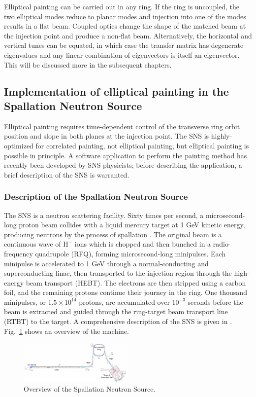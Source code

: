 Elliptical painting can be carried out in any ring. If the ring is uncoupled, the two elliptical modes reduce to planar modes and injection into one of the modes results in a flat beam. Coupled optics change the shape of the matched beam at the injection point and produce a non-flat beam. Alternatively, the horizontal and vertical tunes can be equated, in which case the transfer matrix has degenerate eigenvalues and any linear combination of eigenvectors is itself an eigenvector. This will be discussed more in the subsequent chapters.


\subsection{Implementation of elliptical painting in the Spallation Neutron Source}

Elliptical painting requires time-dependent control of the transverse ring orbit position and slope in both planes at the injection point. The SNS is highly-optimized for correlated painting, not elliptical painting, but elliptical painting is possible in principle. A software application to perform the painting method has recently been developed by SNS physicists; before describing the application, a brief description of the SNS is warranted. 

\subsubsection{Description of the Spallation Neutron Source}

The SNS is a neutron scattering facility. Sixty times per second, a microsecond-long proton beam collides with a liquid mercury target at 1 GeV kinetic energy, producing neutrons by the process of spallation \cite{Russell1990}. The original beam is a continuous wave of H$^-$ ions which is chopped and then bunched in a radio-frequency quadrupole (RFQ), forming microsecond-long minipulses. Each minipulse is accelerated to 1 GeV through a normal-conducting and superconducting linac, then transported to the injection region through the high-energy beam transport (HEBT). The electrons are then stripped using a carbon foil, and the remaining protons continue their journey in the ring. One thousand minipulses, or $1.5 \times 10^{14}$ protons, are accumulated over $10^{-3}$ seconds before the beam is extracted and guided through the ring-target beam transport line (RTBT) to the target. A comprehensive description of the SNS is given in \cite{Henderson2014}. Fig.~\ref{fig:SNS} shows an overview of the machine.
%
\begin{figure}[!p]
    \centering
    \includegraphics[angle=-90, width=0.5\textwidth]{Images/chapter1/SNS.png}
    \caption{Overview of the Spallation Neutron Source.}
    \label{fig:SNS}
\end{figure}
%

